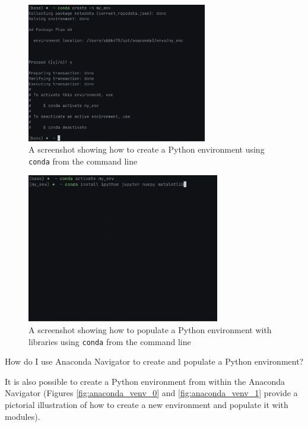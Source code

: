 \documentclass[a4paper,11pt]{book}
\newcommand{\question}[1]{%
    \begin{tcolorbox}[colback=comp_c!10,colframe=comp_c,sidebyside align=top,width=\linewidth,before skip=1ex]
        #1
    \end{tcolorbox}
    \switchcolumn%
}
\newcommand{\note}[1]{%
    \begin{tcolorbox}[colback=white!0,colframe=white!10,width=\linewidth,before skip=1ex]
        #1
    \end{tcolorbox}
}
\begin{document}
\begin{figure}[!htbp]
	\centering
	\includegraphics[width=0.70\textwidth]{conda_env_0}
	\caption{A screenshot showing how to create a Python environment using \texttt{conda} from the command line}
	\label{fig:conda_env_cl_0}
\end{figure}

\begin{figure}[!htbp]
	\centering
	\includegraphics[width=0.75\textwidth]{conda_env_1}
	\caption{A screenshot showing how to populate a Python environment with libraries using \texttt{conda} from the command line}
	\label{fig:conda_env_cl_1}
\end{figure}
\clearpage

\begin{paracol}{2}
	\question{\raggedright How do I use Anaconda Navigator to create and populate a Python environment?}
	\note{
	\quad It is also possible to create a Python environment from within the Anaconda Navigator (Figures \ref{fig:anaconda_venv_0} and \ref{fig:anaconda_venv_1} provide a pictorial illustration of how to create a new environment and populate it with modules).
	}
\end{paracol}
\end{document}
